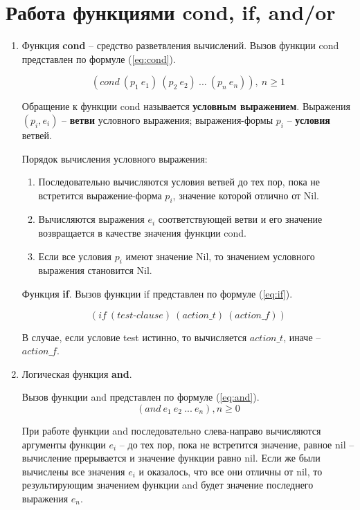 \section{Работа функциями cond, if, and/or}
\begin{enumerate}
	
\item Функция \textbf{cond} -- средство разветвления вычислений.
Вызов функции cond представлен по формуле (\ref{eq:cond}).

\begin{equation}
	\label{eq:cond}
	(cond\ (p_1\ e_1)\ (p_2\ e_2)\ ...\ (p_n\ e_n)),\ n \geq 1
\end{equation}

Обращение к функции cond называется \textbf{условным выражением}. Выражения $(p_i, e_i)$ -- \textbf{ветви} условного выражения; выражения-формы $p_i$ -- \textbf{условия} ветвей.

Порядок вычисления условного выражения:
\begin{enumerate}
	\item Последовательно вычисляются условия ветвей до тех пор, пока не встретится выражение-форма $p_i$, значение которой отлично от Nil.
	\item Вычисляются выражения $e_i$ соответствующей ветви и его значение возвращается в качестве значения функции cond.
	\item Если все условия $p_i$ имеют значение Nil, то значением условного выражения становится Nil.
\end{enumerate}

Функция \textbf{if}. Вызов функции if представлен по формуле (\ref{eq:if}).

 \begin{equation}
 	\label{eq:if}
 	(if\ (test\text{-}clause)\ (action\_t)\ (action\_f))
 \end{equation}

В случае, если условие test истинно, то вычисляется $action\_t$, иначе -- $action\_f$.

\item Логическая функция \textbf{and}. 

Вызов функции and представлен по формуле (\ref{eq:and}).
\begin{equation}
	\label{eq:and}
	(and\ e_1\ e_2\ ...\ e_n), n \geq 0
\end{equation}

При работе функции and последовательно слева-направо вычисляются аргументы функции $e_i$  -- до тех пор, пока не встретится значение, равное nil -- вычисление прерывается и значение функции равно nil. Если же были вычислены все значения $e_i$ и оказалось, что все они отличны от nil, то результирующим значением функции and будет значение последнего выражения $e_n$.


\end{enumerate}
